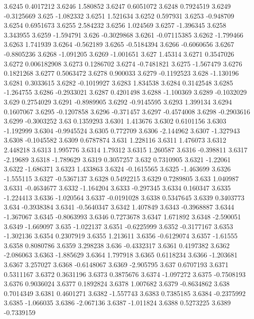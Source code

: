 3.6245  0.4017212
3.6246  1.580852
3.6247  0.6051072
3.6248  0.7924519
3.6249  -0.3125669
3.625  -1.082332
3.6251  1.521634
3.6252  0.597931
3.6253  -0.948709
3.6254  0.6951673
3.6255  2.584232
3.6256  1.024569
3.6257  -1.396345
3.6258  3.343955
3.6259  -1.594791
3.626  -0.3029868
3.6261  -0.07115385
3.6262  -1.799466
3.6263  1.741939
3.6264  -0.562189
3.6265  -0.5184394
3.6266  -0.6060656
3.6267  -0.8805236
3.6268  -1.091205
3.6269  -1.001651
3.627  1.45314
3.6271  0.3547026
3.6272  0.006182908
3.6273  0.1286702
3.6274  -0.7481821
3.6275  -1.567479
3.6276  0.1821268
3.6277  0.5063472
3.6278  0.900033
3.6279  -0.1192523
3.628  -1.130196
3.6281  0.3033615
3.6282  -0.1019927
3.6283  1.834538
3.6284  0.3142548
3.6285  -1.264755
3.6286  -0.2933021
3.6287  0.4201498
3.6288  -1.100369
3.6289  -0.1032029
3.629  0.2754029
3.6291  -0.8989905
3.6292  -0.9145595
3.6293  1.399134
3.6294  0.1607067
3.6295  -0.1207858
3.6296  -0.371457
3.6297  -0.4574008
3.6298  -0.2903616
3.6299  -0.3003252
3.63  0.1359293
3.6301  1.413676
3.6302  0.6101156
3.6303  -1.192999
3.6304  -0.9945524
3.6305  0.772709
3.6306  -2.144962
3.6307  -1.327943
3.6308  -0.1045582
3.6309  0.6787874
3.631  1.228116
3.6311  1.476073
3.6312  2.448218
3.6313  1.995776
3.6314  1.79312
3.6315  1.260587
3.6316  -0.398811
3.6317  -2.19689
3.6318  -1.789629
3.6319  0.3057257
3.632  0.7310905
3.6321  -1.22061
3.6322  -1.686371
3.6323  1.433863
3.6324  -0.1615565
3.6325  -1.463699
3.6326  -1.555115
3.6327  -0.5367137
3.6328  0.5492215
3.6329  0.7289805
3.633  1.040987
3.6331  -0.4634677
3.6332  -1.164204
3.6333  -0.297345
3.6334  0.160347
3.6335  -1.224413
3.6336  -1.020564
3.6337  -0.0191028
3.6338  0.5347645
3.6339  0.3403773
3.634  -0.3938384
3.6341  -0.5640347
3.6342  1.407849
3.6343  -0.3968887
3.6344  -1.367067
3.6345  -0.8063993
3.6346  0.7273678
3.6347  1.671892
3.6348  -2.590051
3.6349  -1.669097
3.635  -1.022137
3.6351  -0.6225999
3.6352  -0.3177167
3.6353  -1.302136
3.6354  0.2307919
3.6355  1.213611
3.6356  -0.6129074
3.6357  -1.61555
3.6358  0.8080786
3.6359  3.298238
3.636  -0.4332317
3.6361  0.4197382
3.6362  -2.086063
3.6363  -1.885629
3.6364  1.797918
3.6365  0.6118234
3.6366  -1.203681
3.6367  3.257027
3.6368  -0.6148067
3.6369  -2.905795
3.637  0.6707193
3.6371  0.5311167
3.6372  0.3631196
3.6373  0.3875676
3.6374  -1.097272
3.6375  -0.7508193
3.6376  0.9036024
3.6377  0.1892824
3.6378  1.007682
3.6379  -0.8634862
3.638  0.7014349
3.6381  0.4601271
3.6382  -1.557743
3.6383  0.7385185
3.6384  -0.2375992
3.6385  -1.066035
3.6386  -2.067136
3.6387  -1.011824
3.6388  0.5273225
3.6389  -0.7339159
